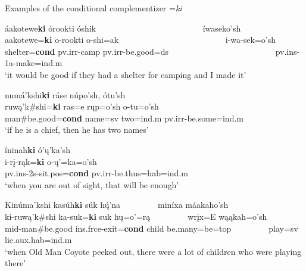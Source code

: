 \begin{exe}

\item\label{conditionalki} Examples of the conditional complementizer =\textit{ki}

	\begin{xlist}
	
	\item\label{conditionalki1} 
	\glll áakotewe\textbf{ki} órookti óshik ~ ~ ~ ~ ~ ~ ~ ~ ~ ~ ~ ~ ~ ~ ~  íwaseko'sh\\
	aakotewe=\textbf{ki} o-rookti o-shi=ak ~ ~ ~ ~ ~ ~ ~ ~ ~ ~ ~ ~ ~ ~ ~  i-wa-sek=o'sh\\
	\textnormal{shelter}=\textbf{cond} pv.irr-\textnormal{camp} pv.irr-\textnormal{be.good}=ds ~ ~ ~ ~ ~ ~ ~ ~ ~ ~ ~ ~ ~ ~ ~  pv.ins-1a-\textnormal{make}=ind.m\\
	\glt `it would be good if they had a shelter for camping and I made it' \citep[3]{hollow1973a}

	\item\label{conditionalki2}
	\glll numá'kshi\textbf{ki} ráse núpo'sh, ótu'sh\\
	ruwą'k\#shi=\textbf{ki} ras=e rųp=o'sh o-tu=o'sh\\
	\textnormal{man}\#\textnormal{be.good}=\textbf{cond} \textnormal{name}=sv \textnormal{two}=ind.m pv.irr-\textnormal{be.some}=ind.m\\
	\glt `if he is a chief, then he has two names' \citep[14]{hollow1973a}

	\item\label{conditionalki3}
	\glll íninah\textbf{ki} ó'ų'ka'sh\\
	i-rį-rąk=\textbf{ki} o-ų'=ka=o'sh\\
	pv.ins-2s-sit.pos=\textbf{cond} pv.irr-\textnormal{be.thus}=hab=ind.m\\
	\glt `when you are out of sight, that will be enough' \citep[25]{hollow1973a}

	\item\label{conditionalki4}
	\glll Kinúma'kshi kasúh\textbf{ki} súk hų́'na ~ ~ ~ ~ ~ miníxa máakaho'sh\\
	ki-ruwą'k\#shi ka-suk=\textbf{ki} suk hų=o'=rą ~ ~ ~ ~ ~ wrįx=E wąąkah=o'sh\\
	mid-\textnormal{man}\#\textnormal{be.good} ins.frce-\textnormal{exit}=\textbf{cond} \textnormal{child} \textnormal{be.many}=\textnormal{be}=\textnormal{top} ~ ~ ~ ~ ~ \textnormal{play}=sv \textnormal{lie}.aux.hab=ind.m\\
	\glt `when Old Man Coyote peeked out, there were a lot of children who were playing there' \citep[28]{hollow1973a} 


\end{xlist}
\end{exe}
